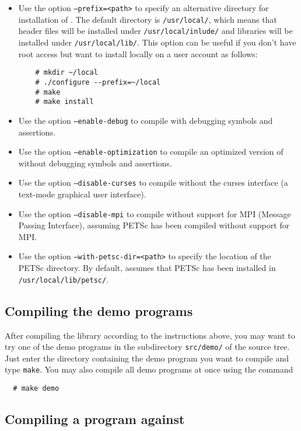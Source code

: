 \begin{itemize}
\item
  Use the option \texttt{--prefix=<path>} to specify an alternative
  directory for installation of \dolfin{}. The default directory is
  \texttt{/usr/local/}, which means that header files will be
  installed under \texttt{/usr/local/inlude/} and libraries will be
  installed under \texttt{/usr/local/lib/}. This option can be useful
  if you don't have root access but want to install \dolfin{} locally
  on a user account as follows:
  \begin{verbatim}
    # mkdir ~/local
    # ./configure --prefix=~/local
    # make
    # make install
  \end{verbatim}
\item
  Use the option \texttt{--enable-debug} to compile \dolfin{} with
  debugging symbols and assertions.
\item
  Use the option \texttt{--enable-optimization} to compile an
  optimized version of \dolfin{} without debugging symbols
  and assertions.
\item
  Use the option \texttt{--disable-curses} to compile \dolfin{}
  without the curses interface (a text-mode graphical user interface).
\item
  Use the option \texttt{--disable-mpi} to compile \dolfin{} without
  support for MPI (Message Passing Interface), assuming PETSc has been
  compiled without support for MPI.
\item
  Use the option \texttt{--with-petsc-dir=<path>} to specify the
  location of the PETSc directory. By default, \dolfin{} assumes that
  PETSc has been installed in \texttt{/usr/local/lib/petsc/}.
\end{itemize}

\subsection{Compiling the demo programs}

After compiling the \dolfin{} library according to the instructions
above, you may want to try one of the demo programs in the
subdirectory \texttt{src/demo/} of the \dolfin{} source tree.
Just enter the directory containing the demo program you want to
compile and type \texttt{make}. You may also compile all demo programs
at once using the command
\begin{verbatim}
  # make demo
\end{verbatim}

\subsection{Compiling a program against \dolfin{}}

